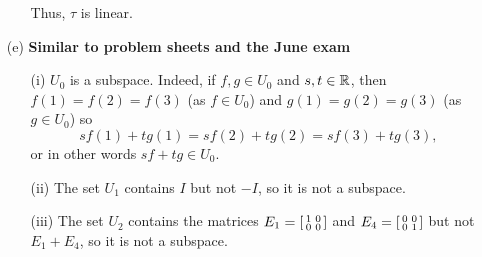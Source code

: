 \documentclass[a4paper]{article}
\begin{document}
\begin{solution}
\begin{itemize}
\begin{itemize}
     Thus, $\tau$ is linear. 
   \end{itemize}
  \item[(e)] \textbf{Similar to problem sheets and the June exam}
   \begin{itemize}
    \item[(i)] $U_0$ is a subspace.  Indeed, if $f,g\in U_0$ and
     $s,t\in{\mathbb{R}}$, then $f(1)=f(2)=f(3)$
     (as $f\in U_0$) and $g(1)=g(2)=g(3)$ (as $g\in U_0$) so
     \[ sf(1)+tg(1) = sf(2)+tg(2) = sf(3)+tg(3), \]
     or in other words $sf+tg\in U_0$.  
    \item[(ii)] The set $U_1$ contains $I$ but not $-I$, so it is not
     a subspace. 
    \item[(iii)] The set $U_2$ contains the matrices
     $E_1=\left[\begin{smallmatrix} 1&0\\0&0\end{smallmatrix}\right]$ and $E_4=\left[\begin{smallmatrix} 0&0\\0&1\end{smallmatrix}\right]$ but not
     $E_1+E_4$, so it is not a subspace. 
   \end{itemize}
 \end{itemize}
\end{solution}
\end{document}
